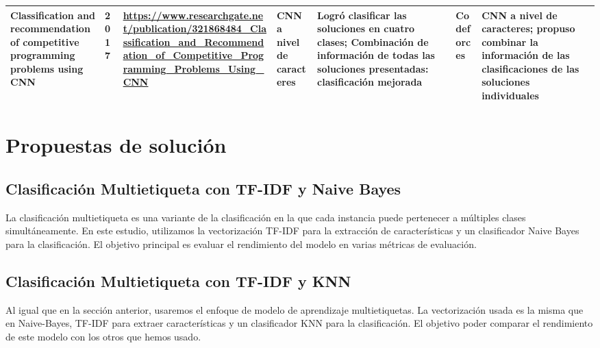 \documentclass{article}
\begin{document}
\begin{itemize}
\begin{longtable}{|p{2cm}|p{0.8cm}|p{2cm}|p{2cm}|p{3cm}|p{2cm}|p{3cm}|}
              \hline
              Classification and recommendation of competitive programming problems
              using CNN
                             & 2017
                             & \href{https://www.researchgate.net/publication/321868484_Classification_and_Recommendation_of_Competitive_Programming_Problems_Using_CNN}{\url{https://www.researchgate.net/publication/321868484_Classification_and_Recommendation_of_Competitive_Programming_Problems_Using_CNN}}

              
              
              
              
              
                             & CNN a nivel de caracteres
                             & Logró clasificar las soluciones en cuatro clases; Combinación de información de todas las soluciones presentadas: clasificación mejorada 
                             & Codeforces 
                             & CNN a nivel de caracteres; propuso combinar la información de las clasificaciones de las soluciones individuales                                                                                                                                                                                                                                                                                                       \\
              
              \hline
              
          \end{longtable}
          
          
\end{itemize}

\section{Propuestas de solución}
\subsection{Clasificación Multietiqueta con TF-IDF y Naive Bayes}
La clasificación multietiqueta es una variante de la clasificación en la que cada instancia puede pertenecer a múltiples clases simultáneamente. En este estudio, utilizamos la vectorización TF-IDF para la extracción de características y un clasificador Naive Bayes para la clasificación. El objetivo principal es evaluar el rendimiento del modelo en varias métricas de evaluación.
\subsection{Clasificación Multietiqueta con TF-IDF y KNN}
Al igual que en la sección anterior, usaremos el enfoque de modelo de aprendizaje multietiquetas. La vectorización usada es la misma que en Naive-Bayes, TF-IDF para extraer características y un clasificador KNN para la clasificación. El objetivo poder comparar el rendimiento de este modelo con los otros que hemos usado.
\end{document}
